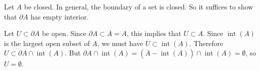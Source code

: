 \documentclass[12pt]{article}
\begin{document}
Let $A$ be closed. In general, the boundary of a set is closed. So it suffices to show that $\partial A$ has empty interior. 

Let $U\subset\partial A$ be open. Since $\partial A\subset \overline{A}=A$, this implies that $U\subset A$. Since $\operatorname{int}(A)$ is the largest open subset of $A$, we must have $U\subset\operatorname{int}(A)$. Therefore $U\subset \partial A \cap \operatorname{int}(A)$. But $\partial A \cap \operatorname{int}(A)=(\overline{A}-\operatorname{int}(A))\cap\operatorname{int}(A)=\emptyset$, so $U=\emptyset$.
\end{document}
